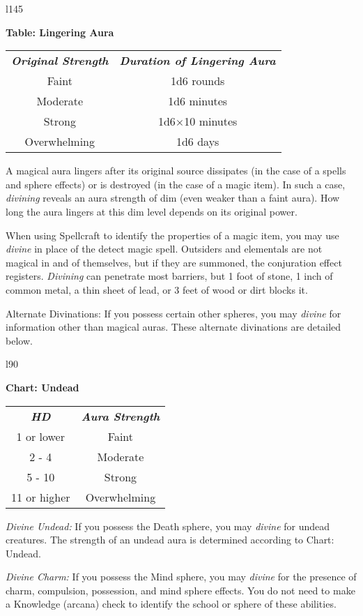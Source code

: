 {\begin{wraptable}[7]{l}{145\unitlength}
		\raggedright\textbf{Table: Lingering Aura}
		\small
		\begin{tabular}{cc}
			\rowcolor{gray!50}
			\textit{\textbf{Original Strength}} & \textit{\textbf{Duration of Lingering Aura}}\tabularnewline
			Faint & 1d6 rounds \tabularnewline
			Moderate & 1d6 minutes \tabularnewline
			Strong & 1d6$\times$10 minutes \tabularnewline
			Overwhelming & 1d6 days \tabularnewline
		\end{tabular}
	\end{wraptable}
	A magical aura lingers after its original source dissipates (in the case of a spells and sphere effects) or is destroyed (in the case of a magic item). In such a case, \textit{divining} reveals an aura strength of dim (even weaker than a faint aura). How long the aura lingers at this dim level depends on its original power.\par
	When using Spellcraft to identify the properties of a magic item, you may use \textit{divine} in place of the detect magic spell. Outsiders and elementals are not magical in and of themselves, but if they are summoned, the conjuration effect registers.  \textit{Divining} can penetrate most barriers, but 1 foot of stone, 1 inch of common metal, a thin sheet of lead, or 3 feet of wood or dirt blocks it.\par
	Alternate Divinations: If you possess certain other spheres,
	you may \textit{divine} for information other than magical auras. These
	alternate divinations are detailed below.
	\begin{wraptable}[7]{l}{90\unitlength}
		\raggedright\textbf{Chart: Undead}
		\small
		\begin{tabular}{cc}
			\rowcolor{gray!50}
			\textit{\textbf{HD}} & \textit{\textbf{Aura Strength}}\tabularnewline
			1 or lower & Faint \tabularnewline
			2 - 4 & Moderate \tabularnewline
			5 - 10 & Strong\tabularnewline
			11 or higher & Overwhelming \tabularnewline
		\end{tabular}
	\end{wraptable}
	\par\textit{Divine Undead:} If you possess the Death sphere, you may \textit{divine} for undead creatures. The strength of an undead aura is determined according to Chart: Undead. \par
	\textit{Divine Charm:} If you possess the Mind sphere, you may \textit{divine} for the presence of charm, compulsion, possession, and mind sphere effects. You do not need to make a Knowledge (arcana) check to identify the school or sphere of these abilities.\par
}
